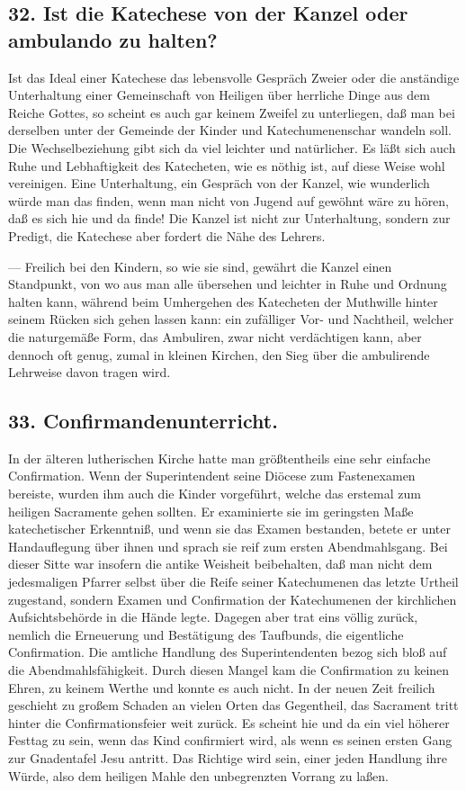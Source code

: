 \subsection*{32. Ist die Katechese von der Kanzel oder ambulando zu halten?}

Ist das Ideal einer Katechese das lebensvolle Gespräch Zweier oder die anständige Unterhaltung einer Gemeinschaft von Heiligen über herrliche Dinge aus dem Reiche Gottes, so scheint es auch gar keinem Zweifel zu unterliegen, daß man bei derselben unter der Gemeinde der Kinder und Katechumenenschar wandeln soll. Die Wechselbeziehung gibt sich da
viel leichter und natürlicher. Es läßt sich auch Ruhe und Lebhaftigkeit des Katecheten, wie es nöthig ist, auf diese Weise wohl vereinigen. Eine Unterhaltung, ein Gespräch von der Kanzel, wie wunderlich würde man das finden, wenn man nicht von Jugend auf gewöhnt wäre zu hören, daß es sich hie und da finde! Die Kanzel ist nicht zur Unterhaltung, sondern zur Predigt, die Katechese aber fordert die Nähe des Lehrers.

— Freilich bei den Kindern, so wie sie sind, gewährt die Kanzel einen Standpunkt, von wo aus man alle übersehen und leichter in Ruhe und Ordnung halten kann, während beim Umhergehen des Katecheten der Muthwille hinter seinem Rücken sich gehen lassen kann: ein zufälliger Vor- und Nachtheil, welcher die naturgemäße Form, das Ambuliren, zwar nicht verdächtigen kann, aber dennoch oft genug, zumal in kleinen Kirchen, den Sieg über die ambulirende Lehrweise davon tragen wird.

\subsection*{33. Confirmandenunterricht.}

In der älteren lutherischen Kirche hatte man größtentheils eine sehr einfache Confirmation. Wenn der Superintendent seine Diöcese zum Fastenexamen bereiste, wurden ihm auch die Kinder vorgeführt, welche das erstemal zum heiligen Sacramente gehen sollten. Er examinierte sie im geringsten Maße katechetischer Erkenntniß, und wenn sie das Examen bestanden, betete er unter Handauflegung über ihnen und sprach sie reif zum ersten Abendmahlsgang. Bei dieser Sitte war
insofern die antike Weisheit beibehalten, daß man nicht dem jedesmaligen Pfarrer selbst über die Reife seiner Katechumenen das letzte Urtheil zugestand, sondern Examen und Confirmation der Katechumenen der kirchlichen Aufsichtsbehörde in die Hände legte. Dagegen aber trat eins völlig zurück, nemlich die Erneuerung und Bestätigung des Taufbunds, die eigentliche Confirmation. Die amtliche Handlung des Superintendenten bezog sich bloß auf die Abendmahlsfähigkeit. Durch diesen Mangel kam die Confirmation zu keinen Ehren, zu keinem Werthe und konnte es auch nicht. In der neuen Zeit freilich geschieht zu großem Schaden an vielen Orten das Gegentheil, das Sacrament tritt hinter die Confirmationsfeier weit zurück. Es scheint hie und da ein viel höherer Festtag zu sein, wenn das Kind confirmiert wird, als wenn es seinen ersten Gang zur Gnadentafel Jesu antritt. Das Richtige wird sein, einer jeden Handlung ihre Würde, also dem heiligen Mahle den unbegrenzten Vorrang zu laßen.

